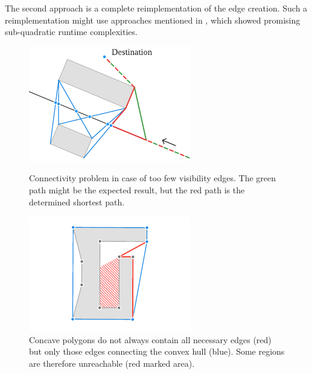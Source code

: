 		The second approach is a complete reimplementation of the edge creation.
		Such a reimplementation might use approaches mentioned in , which showed promising sub-quadratic runtime complexities.
		
		\begin{figure}
			\includegraphics[width=\linewidth]{images/qgis-future-work-connectivity-problem}
			\caption[Example connectivity problem.]{Connectivity problem in case of too few visibility edges. The green path might be the expected result, but the red path is the determined shortest path.}
			\label{fig:connectivity-problem}
			\vspace{0.5\baselineskip}
			\includegraphics[width=\linewidth]{images/qgis-future-work-convex-hull-problem}
			\caption[Illustration of unreachable areas in concave polygons.]{Concave polygons do not always contain all necessary edges (red) but only those edges connecting the convex hull (blue). Some regions are therefore unreachable (red marked area).}
			\label{fig:convex-hull-problem}
		\end{figure}
				
